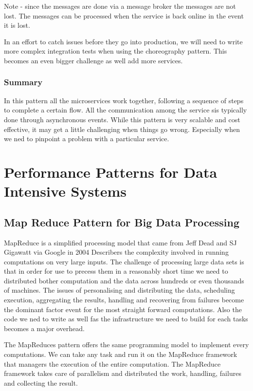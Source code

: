\documentclass[a4paper, 11pt]{book}
\begin{document}
    Note - since the messages are done via a message broker the messages are not lost.
    The messages can be processed when the service is back online in the event it is lost.

    In an effort to catch issues before they go into production, we will need to write more complex integration tests when using the choreography pattern.
    This becomes an even bigger challenge as well add more services.

    \subsubsection{Summary}
    In this pattern all the microservices work together, following a sequence of steps to complete a certain flow.
    All the communication among the service sis typically done through asynchronous events.
    While this pattern is very scalable and cost effective, it may get a little challenging when things go wrong.
    Especially when we ned to pinpoint a problem with a particular service.

    \section{Performance Patterns for Data Intensive Systems}

    \subsection{Map Reduce Pattern for Big Data Processing}
    MapReduce is a simplified processing model that came from Jeff Dead and SJ Gigawatt via Google in 2004
    Describers the complexity involved in running computations on very large inputs.
    The challenge of processing large data sets is that in order for use to precess them in a reasonably short time we need to distributed bother computation and the data across hundreds or even thousands of machines.
    The issues of personalising and distributing the data, scheduling execution, aggregating the results, handling and recovering from failures become the dominant factor event for the most straight forward computations.
    Also the code we ned to write as well fas the infrastructure we need to build for each tasks becomes a major overhead.

    The MapReduces pattern offers the same programming model to implement every computations.
    We can take any task and run it on the MapReduce framework that managers the execution of the entire computation.
    The MapReduce framework takes care of parallelism and distributed the work, handling, failures and collecting the result.
\end{document}
